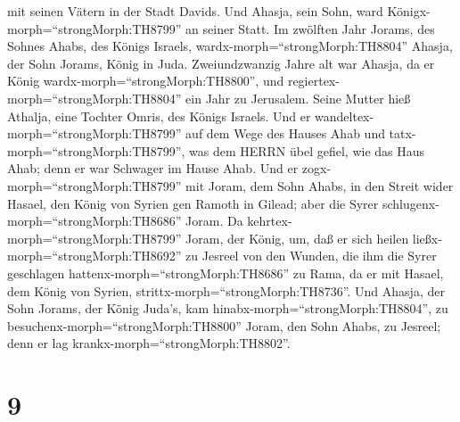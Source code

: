 mit seinen Vätern in der Stadt Davids. Und Ahasja, sein Sohn, ward
Königx-morph=``strongMorph:TH8799'' an seiner Statt.  Im
zwölften Jahr Jorams, des Sohnes Ahabs, des Königs Israels,
wardx-morph=``strongMorph:TH8804'' Ahasja, der Sohn Jorams, König in
Juda.  Zweiundzwanzig Jahre alt war Ahasja, da er König
wardx-morph=``strongMorph:TH8800'', und
regiertex-morph=``strongMorph:TH8804'' ein Jahr zu Jerusalem. Seine
Mutter hieß Athalja, eine Tochter Omris, des Königs Israels.
 Und er wandeltex-morph=``strongMorph:TH8799'' auf dem Wege
des Hauses Ahab und tatx-morph=``strongMorph:TH8799'', was dem HERRN
übel gefiel, wie das Haus Ahab; denn er war Schwager im Hause Ahab.
 Und er zogx-morph=``strongMorph:TH8799'' mit Joram, dem
Sohn Ahabs, in den Streit wider Hasael, den König von Syrien gen Ramoth
in Gilead; aber die Syrer schlugenx-morph=``strongMorph:TH8686'' Joram.
 Da kehrtex-morph=``strongMorph:TH8799'' Joram, der König,
um, daß er sich heilen ließx-morph=``strongMorph:TH8692'' zu Jesreel von
den Wunden, die ihm die Syrer geschlagen
hattenx-morph=``strongMorph:TH8686'' zu Rama, da er mit Hasael, dem
König von Syrien, strittx-morph=``strongMorph:TH8736''. Und Ahasja, der
Sohn Jorams, der König Juda's, kam hinabx-morph=``strongMorph:TH8804'',
zu besuchenx-morph=``strongMorph:TH8800'' Joram, den Sohn Ahabs, zu
Jesreel; denn er lag krankx-morph=``strongMorph:TH8802''.

\hypertarget{section-8}{%
\section{9}\label{section-8}}

